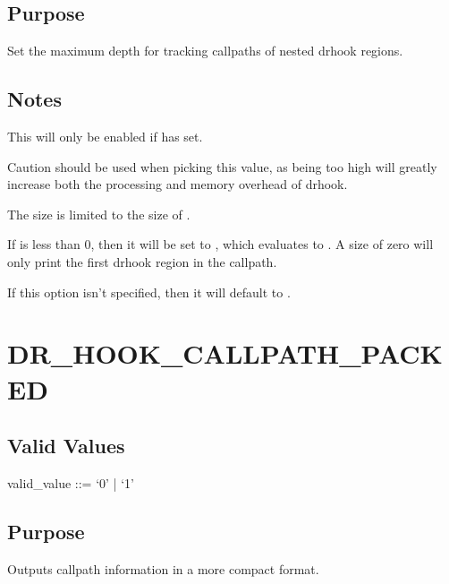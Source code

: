 \documentclass[letterpaper,10pt,english]{sphinxmanual}
\begin{document}
\subsection{Purpose}
\label{\detokenize{flag/flag:id261}}
\sphinxAtStartPar
Set the maximum depth for tracking callpaths of nested drhook regions.


\subsection{Notes}
\label{\detokenize{flag/flag:id262}}
\sphinxAtStartPar
This will only be enabled if {\hyperref[\detokenize{flag/flag:dr-hook-opt}]{}} has  set.

\sphinxAtStartPar
Caution should be used when picking this value, as being too high will greatly increase both the processing and memory overhead of drhook.

\sphinxAtStartPar
The size is limited to the size of .

\sphinxAtStartPar
If  is less than 0, then it will be set to , which evaluates to . A size of zero will only print the first drhook region in the callpath.

\sphinxAtStartPar
If this option isn’t specified, then it will default to .


\section{DR\_HOOK\_CALLPATH\_PACKED}
\label{\detokenize{flag/flag:dr-hook-callpath-packed}}\label{\detokenize{flag/flag:id264}}

\subsection{Valid Values}
\label{\detokenize{flag/flag:id265}}
\begin{DUlineblock}{0em}
\item[] valid\_value ::= ‘0’ | ‘1’
\end{DUlineblock}


\subsection{Purpose}
\label{\detokenize{flag/flag:id266}}
\sphinxAtStartPar
Outputs callpath information in a more compact format.
\end{document}
